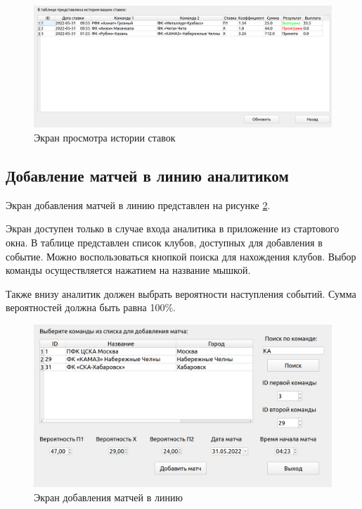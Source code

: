 \FloatBarrier
\begin{figure}[hp]	
	\begin{center}
		\includegraphics[width=\linewidth]{inc/history.png}
	\end{center}
	\caption{Экран просмотра истории ставок}
	\label{fig::history}
\end{figure}
\FloatBarrier

\subsection{Добавление матчей в линию аналитиком}
Экран добавления матчей в линию представлен на рисунке \ref{fig::add}.

Экран доступен только в случае входа аналитика в приложение из стартового окна.
В таблице представлен список клубов, доступных для добавления в событие.
Можно воспользоваться кнопкой поиска для нахождения клубов.
Выбор команды осуществляется нажатием на название мышкой.

Также внизу аналитик должен выбрать вероятности наступления событий. 
Сумма вероятностей должна быть равна 100\%.

\FloatBarrier
\begin{figure}[hp]	
	\begin{center}
		\includegraphics[width=\linewidth]{inc/addMatch.png}
	\end{center}
	\caption{Экран добавления матчей в линию}
	\label{fig::add}
\end{figure}
\FloatBarrier

